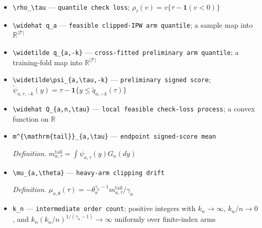 \documentclass{article}
\begin{document}
\begin{itemize}
  \par\smallskip\noindent\emph{Definition.} the definition of \(D_{a,n}\) with \(\widehat\pi^{\mathrm{esc}}_{a,-k}\) replacing \(\widehat\pi_{a,-k}\)
  \item \texttt{\textbackslash{}\allowbreak{}rho\_\allowbreak{}\textbackslash{}\allowbreak{}tau} --- \texttt{quantile check loss}; \(\rho_\tau(v)=v\{\tau-\mathbf1(v<0)\}\)
  \item \texttt{\textbackslash{}\allowbreak{}widehat q\_\allowbreak{}a} --- \texttt{feasible clipped-\allowbreak{}IPW arm quantile}; a sample map into \(\mathbb R^{|\mathcal T|}\)
  \item \texttt{\textbackslash{}\allowbreak{}widetilde q\_\allowbreak{}\{a,\allowbreak{}-\allowbreak{}k\}\allowbreak{}} --- \texttt{cross-\allowbreak{}fitted preliminary arm quantile}; a training-fold map into \(\mathbb R^{|\mathcal T|}\)
  \item \texttt{\textbackslash{}\allowbreak{}widetilde\textbackslash{}\allowbreak{}psi\_\allowbreak{}\{a,\allowbreak{}\textbackslash{}\allowbreak{}tau,\allowbreak{}-\allowbreak{}k\}\allowbreak{}} --- \texttt{preliminary signed score}; \(\widetilde\psi_{a,\tau,-k}(y)=\tau-\mathbf1\{y\le\widetilde q_{a,-k}(\tau)\}\)
  \item \texttt{\textbackslash{}\allowbreak{}widehat Q\_\allowbreak{}\{a,\allowbreak{}n,\allowbreak{}\textbackslash{}\allowbreak{}tau\}\allowbreak{}} --- \texttt{local feasible check-\allowbreak{}loss process}; a convex function on \(\mathbb R\)
  \item \texttt{m\textasciicircum{}\{\textbackslash{}\allowbreak{}mathrm\{tail\}\allowbreak{}\}\allowbreak{}\_\allowbreak{}\{a,\allowbreak{}\textbackslash{}\allowbreak{}tau\}\allowbreak{}} --- \texttt{endpoint signed-\allowbreak{}score mean}
  \par\smallskip\noindent\emph{Definition.} \(m^{\mathrm{tail}}_{a,\tau}=\int\psi_{a,\tau}(y)G_a(dy)\)
  \item \texttt{\textbackslash{}\allowbreak{}mu\_\allowbreak{}\{a,\allowbreak{}\textbackslash{}\allowbreak{}theta\}\allowbreak{}} --- \texttt{heavy-\allowbreak{}arm clipping drift}
  \par\smallskip\noindent\emph{Definition.} \(\mu_{a,\theta}(\tau)=-\theta_a^{\gamma_a-1}m^{\mathrm{tail}}_{a,\tau}/\gamma_a\)
  \item \texttt{k\_\allowbreak{}n} --- \texttt{intermediate order count}; positive integers with \(k_n\to\infty\), \(k_n/n\to0\), and \(k_n(k_n/n)^{1/(\gamma_a-1)}\to\infty\) uniformly over finite-index arms

\end{itemize}
\end{document}
